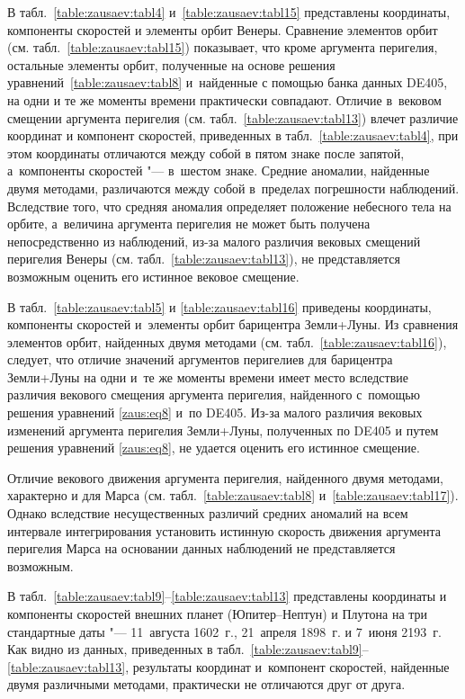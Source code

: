 В табл.~\ref{table:zausaev:tabl4} и~\ref{table:zausaev:tabl15} представлены координаты, компоненты скоростей и элементы орбит Венеры. 
Сравнение элементов орбит (см. табл.~\ref{table:zausaev:tabl15}) показывает, что кроме аргумента перигелия, остальные элементы орбит, полученные на основе решения уравнений~\eqref{table:zausaev:tabl8} и~найденные с помощью банка данных DE405, на одни и те же моменты времени практически совпадают. 
Отличие в~вековом смещении аргумента перигелия (см. табл.~\ref{table:zausaev:tabl13}) влечет различие координат и компонент скоростей, приведенных в табл.~\ref{table:zausaev:tabl4}, при этом координаты отличаются между собой в пятом знаке после запятой, а~компоненты скоростей "--- в~шестом знаке. 
Средние аномалии, найденные двумя методами, различаются между собой в~пределах погрешности наблюдений. 
Вследствие того, что средняя аномалия определяет положение небесного тела на орбите, а~величина аргумента перигелия не может быть получена непосредственно из наблюдений, из-за малого различия вековых смещений перигелия Венеры (см. табл.~\ref{table:zausaev:tabl13}), не представляется возможным оценить его истинное вековое смещение.

В табл.~\ref{table:zausaev:tabl5} и \ref{table:zausaev:tabl16} приведены координаты, компоненты скоростей и~элементы орбит барицентра Земли+Луны. 
Из сравнения элементов орбит, найденных двумя методами (см. табл.~\ref{table:zausaev:tabl16}), следует, что отличие значений аргументов перигелиев для барицентра Земли+Луны на одни и~те же моменты времени имеет место вследствие различия векового смещения аргумента перигелия, найденного с~помощью решения уравнений \eqref{zaus:eq8} и~по DE405. 
Из-за малого различия вековых изменений аргумента перигелия Земли+Луны, полученных по DE405 и путем решения уравнений \eqref{zaus:eq8}, не удается оценить его истинное смещение.

Отличие векового движения аргумента перигелия, найденного двумя методами, характерно и для Марса (см. табл.~\ref{table:zausaev:tabl8} и~\ref{table:zausaev:tabl17}). 
Однако вследствие несущественных различий средних аномалий на всем интервале интегрирования установить истинную скорость движения аргумента перигелия Марса на основании данных наблюдений не представляется возможным.

В табл.~\ref{table:zausaev:tabl9}--\ref{table:zausaev:tabl13} представлены координаты и компоненты скоростей внешних планет (Юпитер--Нептун) и Плутона на три стандартные даты "--- 11~августа 1602~г., 21~апреля 1898~г. и 7~июня 2193~г. 
Как видно из данных, приведенных в табл.~\ref{table:zausaev:tabl9}--\ref{table:zausaev:tabl13}, результаты координат и~компонент скоростей, найденные двумя различными методами, практически не отличаются друг от друга.

